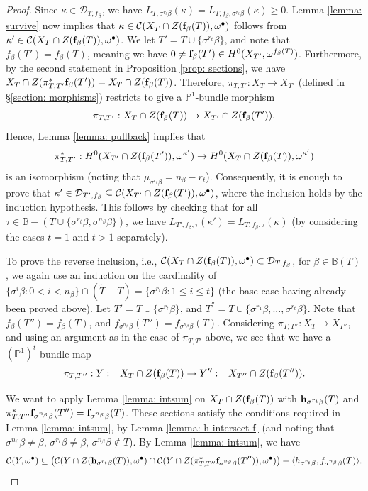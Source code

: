 \documentclass[11pt,pdflatex]{amsart}
\theoremstyle{plain}
\theoremstyle{definition}
\theoremstyle{plain}
\theoremstyle{definition}
\theoremstyle{remark}
\numberwithin{equation}{section}
\numberwithin{figure}{section} \numberwithin{table}{subsection}
\newcommand{\calC}{{\mathcal{C}}}
\newcommand{\calD}{{\mathcal{D}}}
\def\BB{\mathbb{B}}
\def\PP{\mathbb{P}}
\begin{document}
\begin{proof}
Since $\kappa \in \calD_{T,f_\beta}$, we have  $L_{T,\sigma^{r_t}\beta}(\kappa)=L_{T,f_\beta,\sigma^{r_t}\beta}(\kappa)\geq 0$.  Lemma \ref{lemma: survive} now implies that $\kappa \in \calC(X_T\cap Z({\bf f}_\beta(T)),\omega^\bullet)$ follows from  $\kappa' \in \calC(X_T\cap Z({\bf f}_\beta(T)),\omega^\bullet)$.   We let $T'=T \cup \{\sigma^{r_t}\beta\}$, and note that $f_\beta(T')=f_\beta(T)$, meaning we have   $0 \neq {\bf f}_\beta(T') \in H^0(X_{T'},\omega^{f_\beta(T)})$. Furthermore, by the second statement in Proposition \ref{prop: sections}, we have $X_T \cap Z(\pi_{T,T'}^*{\bf f}_\beta(T'))=X_T \cap Z({\bf f}_\beta(T))$. Therefore,  $\pi_{T,T'}: X_T \rightarrow X_{T'}$ (defined in \S \ref{section: morphisms}) restricts to give a $\PP^1$-bundle morphism
\[
\pi_{T,T'}: X_T \cap Z({\bf f}_\beta(T)) \rightarrow X_{T'} \cap Z({\bf f}_\beta(T')).
\]
Hence, Lemma \ref{lemma: pullback} implies that
\[
\pi^*_{T,T'}: H^0(X_{T'}\cap Z({\bf f}_\beta(T')), \omega^{\kappa'}) \rightarrow H^0(X_T\cap Z({\bf f}_\beta(T)) , \omega^{\kappa'})
\]
is an isomorphism (noting that $\mu_{\sigma^{r_t}\beta}=n_\beta-r_t$). Consequently,   it is enough to prove that $\kappa' \in \calD_{T',f_\beta} \subseteq \calC(X_{T'}\cap Z({\bf f}_\beta(T')),\omega^\bullet)$, where the inclusion holds  by the induction hypothesis. This follows by checking that for all $\tau \in \BB-(T \cup \{\sigma^{r_t}\beta,\sigma^{n_\beta}\beta\})$, we have $L_{T',f_\beta,\tau}(\kappa')=L_{T,f_\beta,\tau}(\kappa)$ (by considering the cases $t=1$ and $t>1$ separately).


To prove the reverse inclusion, i.e.,  $\calC(X_T\cap Z({\bf f}_\beta(T)),\omega^\bullet)\subset \calD_{T,f_\beta}$, for $\beta \in \BB(T)$, we again use an induction on the cardinality of $\{\sigma^i\beta: 0 < i <n_\beta\} \cap (\tilde{T}-T)=\{\sigma^{r_i}\beta: 1 \leq i \leq t\}$ (the base case having already been proved above). Let $T'=T \cup \{\sigma^{r_t}\beta\}$, and $T^{''}=T \cup \{\sigma^{r_1}\beta,...,\sigma^{r_t}\beta \}$. Note that $f_\beta(T'')=f_\beta(T)$, and $f_{\sigma^{n_\beta}\beta}(T'')=f_{\sigma^{n_\beta}\beta}(T)$.  Considering $\pi_{T,T''}: X_T \rightarrow X_{T''}$, and using an argument as in the case of $\pi_{T,T'}$ above, we see that we have a $(\PP^1)^t$-bundle map $$\pi_{T,T''}: Y:=X_T \cap Z({\bf f}_\beta(T)) \rightarrow Y'':=X_{T''} \cap Z({\bf f}_\beta(T'')).$$

We want to apply Lemma \ref{lemma: intsum} on $X_T \cap Z({\bf f}_\beta(T))$ with ${\bf h}_{\sigma^{r_t}\beta}(T)$ and $\pi_{T,T''}^*{\bf f}_{\sigma^{n_\beta}\beta}(T'')={\bf f}_{\sigma^{n_\beta}\beta}(T)$. These sections satisfy the conditions required in Lemma \ref{lemma: intsum}, by Lemma \ref{lemma: h intersect f} (and noting that  $\sigma^{n_\beta}\beta \neq \beta$, $\sigma^{r_t}\beta \neq \beta$, $\sigma^{n_\beta}\beta\not\in T$). By Lemma \ref{lemma: intsum}, we have 
$$\calC(Y,\omega^\bullet) \subseteq \big(\calC(Y\cap Z({\bf h}_{\sigma^{r_t}\beta}(T)),\omega^\bullet) \cap \calC(Y \cap Z(\pi_{T,T''}^*{\bf f}_{\sigma^{n_\beta}\beta}(T'')),\omega^\bullet) \big)+\langle h_{\sigma^{r_t}\beta}, f_{\sigma^{n_\beta}\beta}(T) \rangle.$$


\end{proof}
\end{document}
